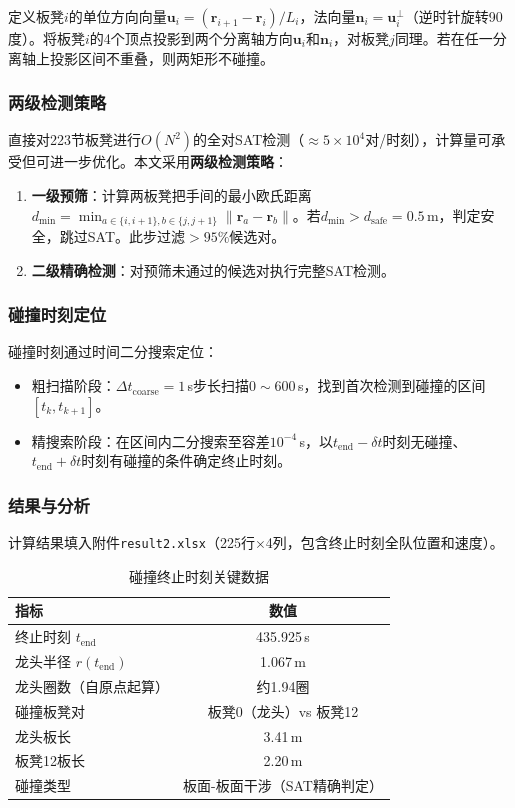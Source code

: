 \documentclass[12pt]{ctexart}
\begin{document}
定义板凳$i$的单位方向向量$\bm{u}_i = (\bm{r}_{i+1}-\bm{r}_i)/L_i$，法向量$\bm{n}_i = \bm{u}_i^\perp$（逆时针旋转90度）。将板凳$i$的4个顶点投影到两个分离轴方向$\bm{u}_i$和$\bm{n}_i$，对板凳$j$同理。若在任一分离轴上投影区间不重叠，则两矩形不碰撞。

\subsubsection{两级检测策略}

直接对223节板凳进行$O(N^2)$的全对SAT检测（$\approx 5\times 10^4$对/时刻），计算量可承受但可进一步优化。本文采用\textbf{两级检测策略}：

\begin{enumerate}[label=(\arabic*)]
  \item \textbf{一级预筛}：计算两板凳把手间的最小欧氏距离$d_{\min} = \min_{a\in\{i,i+1\},b\in\{j,j+1\}} \|\bm{r}_a-\bm{r}_b\|$。若$d_{\min} > d_{\text{safe}}=0.5$\,m，判定安全，跳过SAT。此步过滤$>95\%$候选对。
  \item \textbf{二级精确检测}：对预筛未通过的候选对执行完整SAT检测。
\end{enumerate}

\subsubsection{碰撞时刻定位}

碰撞时刻通过时间二分搜索定位：
\begin{itemize}
  \item 粗扫描阶段：$\Delta t_{\text{coarse}}=1$\,s步长扫描$0\sim 600$\,s，找到首次检测到碰撞的区间$[t_k,t_{k+1}]$。
  \item 精搜索阶段：在区间内二分搜索至容差$10^{-4}$\,s，以$t_{\text{end}}-\delta t$时刻无碰撞、$t_{\text{end}}+\delta t$时刻有碰撞的条件确定终止时刻。
\end{itemize}

\subsubsection{结果与分析}

计算结果填入附件\texttt{result2.xlsx}（225行$\times$4列，包含终止时刻全队位置和速度）。

\begin{table}[htbp]
\centering
\caption{碰撞终止时刻关键数据}
\label{tab:q2_key}
\begin{tabular}{lc}
\toprule
指标 & 数值 \\
\midrule
终止时刻 $t_{\text{end}}$ & 435.925\,s \\
龙头半径 $r(t_{\text{end}})$ & 1.067\,m \\
龙头圈数（自原点起算） & 约1.94圈 \\
碰撞板凳对 & 板凳0（龙头）vs 板凳12 \\
龙头板长 & 3.41\,m \\
板凳12板长 & 2.20\,m \\
碰撞类型 & 板面-板面干涉（SAT精确判定） \\
\bottomrule
\end{tabular}
\end{table}
\end{document}
